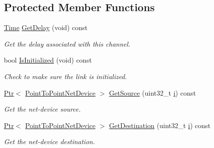 \subsection*{Protected Member Functions}
\begin{DoxyCompactItemize}
\item 
\hyperlink{classns3_1_1Time}{Time} \hyperlink{classns3_1_1PointToPointChannel_a42bc95ef9f6853f310f944233799a6e7}{Get\+Delay} (void) const 
\begin{DoxyCompactList}\small\item\em Get the delay associated with this channel. \end{DoxyCompactList}\item 
bool \hyperlink{classns3_1_1PointToPointChannel_a6c439809e1b060a0817b4c8878ef7077}{Is\+Initialized} (void) const 
\begin{DoxyCompactList}\small\item\em Check to make sure the link is initialized. \end{DoxyCompactList}\item 
\hyperlink{classns3_1_1Ptr}{Ptr}$<$ \hyperlink{classns3_1_1PointToPointNetDevice}{Point\+To\+Point\+Net\+Device} $>$ \hyperlink{classns3_1_1PointToPointChannel_a4efe45237b67f67d8178a6113d8c5e30}{Get\+Source} (uint32\+\_\+t \hyperlink{lte__uplink__power__control_8m_a6f6ccfcf58b31cb6412107d9d5281426}{i}) const 
\begin{DoxyCompactList}\small\item\em Get the net-\/device source. \end{DoxyCompactList}\item 
\hyperlink{classns3_1_1Ptr}{Ptr}$<$ \hyperlink{classns3_1_1PointToPointNetDevice}{Point\+To\+Point\+Net\+Device} $>$ \hyperlink{classns3_1_1PointToPointChannel_a0fda1bded8c7ccebf97e406deb001e3a}{Get\+Destination} (uint32\+\_\+t \hyperlink{lte__uplink__power__control_8m_a6f6ccfcf58b31cb6412107d9d5281426}{i}) const 
\begin{DoxyCompactList}\small\item\em Get the net-\/device destination. \end{DoxyCompactList}\end{DoxyCompactItemize}
